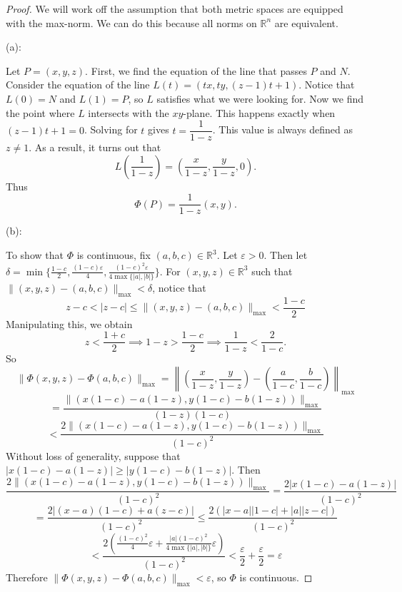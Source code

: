 \documentclass{article}
\theoremstyle{plain} %
\numberwithin{thm}{section} %
\theoremstyle{definition}
\begin{document}
        \begin{proof}
            We will work off the assumption that both metric spaces are equipped with the max-norm. We can do this because all norms on \(\mathbb{R}^n\) are equivalent.

            (a):

            Let \(P=(x,y,z)\). First, we find the equation of the line that passes \(P\) and \(N\). Consider the equation of the line \(L(t) = (tx, ty, (z-1)t + 1)\). Notice that \(L(0) = N\) and \(L(1) = P\), so \(L\) satisfies what we were looking for. Now we find the point where \(L\) intersects with the \(xy\)-plane. This happens exactly when \((z-1)t+1=0\). Solving for \(t\) gives \(t=\dfrac{1}{1-z}\). This value is always defined as \(z\neq 1\). As a result, it turns out that
            \[
                L\left(\frac{1}{1-z}\right) = \left(\frac{x}{1-z}, \frac{y}{1-z}, 0\right) \text{.}
            \]
            Thus
            \[
                \Phi (P) = \frac{1}{1-z}\left(x,y\right) \text{.}
            \]

            (b):
            
            To show that \(\Phi\) is continuous, fix \((a,b,c) \in \mathbb{R}^3\). Let \(\varepsilon > 0\). Then let \(\delta = \min \{\frac{1-c}{2}, \frac{(1-c)\varepsilon}{4}, \frac{(1-c)^2 \varepsilon}{4\max \{|a|,|b|\}}\}\). For \((x,y,z) \in \mathbb{R}^3\) such that \(\|(x,y,z) - (a,b,c)\| _{\max} < \delta\), notice that
            \[
                z-c < |z-c| \leq \|(x,y,z) - (a,b,c)\| _{\max} < \frac{1-c}{2}
            \]
            Manipulating this, we obtain
            \[
                z < \frac{1+c}{2} \implies 1 - z > \frac{1-c}{2} \implies \frac{1}{1-z} < \frac{2}{1-c} \text{.} 
            \]
            So
            \[
                \|\Phi (x,y,z) - \Phi (a,b,c)\| _{\max} = \left\lVert \left(\frac{x}{1-z}, \frac{y}{1-z}\right) - \left(\frac{a}{1-c}, \frac{b}{1-c}\right) \right\rVert _{\max}
            \]
            \[
                =\frac{\|(x(1-c) - a(1-z), y(1-c) - b(1-z))\| _{\max}}{(1-z)(1-c)}
            \]
            \[
                < \frac{2\|(x(1-c) - a(1-z), y(1-c) - b(1-z))\| _{\max}}{(1-c)^2}
            \]
            Without loss of generality, suppose that \(|x(1-c) - a(1-z)| \geq |y(1-c) - b(1-z)|\). Then
            \[
                \frac{2\|(x(1-c) - a(1-z), y(1-c) - b(1-z))\| _{\max}}{(1-c)^2} = \frac{2|x(1-c) - a(1-z)|}{(1-c)^2}
            \]
            \[
                = \frac{2|(x-a)(1-c) + a(z-c)|}{(1-c)^2} \leq \frac{2(|x-a||1-c| + |a||z-c|)}{(1-c)^2}
            \]
            \[
                < \frac{2 \left(\frac{(1-c)^2}{4}\varepsilon + \frac{|a|(1-c)^2}{4\max \{|a|,|b|\}}\varepsilon\right)}{(1-c)^2} < \frac{\varepsilon}{2} + \frac{\varepsilon}{2} = \varepsilon
            \]
            Therefore \(\|\Phi (x,y,z) - \Phi (a,b,c)\| _{\max} <\varepsilon\), so \(\Phi\) is continuous.


\end{proof}
\end{document}
